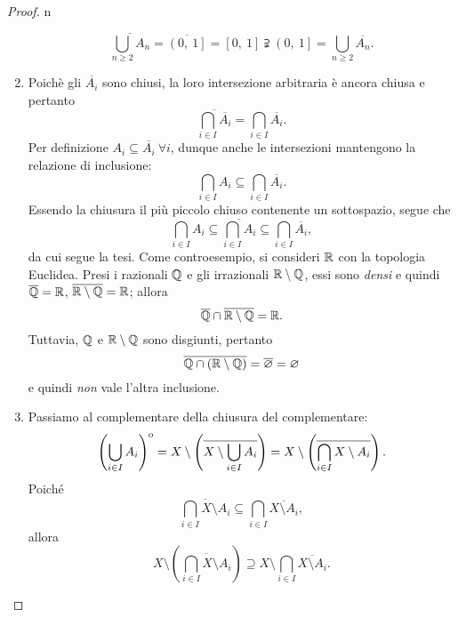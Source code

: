 \begin{proof}{n}
\begin{enumerate}[label=\Roman*]
\begin{equation*}
	\overline{\bigcup_{n\geq 2}A_n}=\overline{\left(0,\ 1\right]}=\left[0,\ 1\right]\supsetneqq\left(0,\ 1\right]=\bigcup_{n\geq 2}\overline{A_n}.
\end{equation*}
\item Poichè gli $\overline{A_i}$ sono chiusi, la loro intersezione arbitraria è ancora chiusa e pertanto
\begin{equation*}
	\overline{\bigcap_{i\in I}\overline{A_i}}=\bigcap_{i\in I}\overline{A_i}.
\end{equation*}
Per definizione $A_i\subseteq\overline{A_i}\ \forall i$, dunque anche le intersezioni mantengono la relazione di inclusione:
\begin{equation*}
	\bigcap_{i\in I}A_i\subseteq\bigcap_{i\in I}\overline{A_i}.
\end{equation*}
Essendo la chiusura il più piccolo chiuso contenente un sottospazio, segue che
\begin{equation*}
	\bigcap_{i\in I}A_i\subseteq\overline{\bigcap_{i\in I}A_i}\subseteq\bigcap_{i\in I}\overline{A_i},
\end{equation*}
da cui segue la tesi. Come controesempio, si consideri $\mathbb{R}$ con la topologia Euclidea. Presi i razionali $\mathbb{Q}$ e gli irrazionali $\mathbb{R}\setminus\mathbb{Q}$, essi sono \textit{densi} e quindi $\overline{\mathbb{Q}}=\mathbb{R}$, $\overline{\mathbb{R}\setminus\mathbb{Q}}=\mathbb{R}$; allora
\begin{equation*}
	\overline{\mathbb{Q}}\cap\overline{\mathbb{R}\setminus\mathbb{Q}}=\mathbb{R}.
\end{equation*}
Tuttavia, $\mathbb{Q}$ e $\mathbb{R}\setminus\mathbb{Q}$ sono disgiunti, pertanto
\begin{equation*}
	\overline{\mathbb{Q}\cap\left(\mathbb{R}\setminus\mathbb{Q}\right)}=\overline{\varnothing}=\varnothing
\end{equation*}
e quindi \textit{non} vale l'altra inclusione.
\item Passiamo al complementare della chiusura del complementare:
\begin{equation*}
{\kern0pt\left(\bigcup_{i\in I}A_i\right)}^{\mathrm{o}}=X\setminus\left(\overline{X\setminus \bigcup_{i\in I}A_i}\right)=X\setminus\left(\overline{\bigcap_{i\in I}X\setminus A_i}\right).
\end{equation*}
Poiché
\begin{equation*}
	\overline{\bigcap_{i\in I}X\setminus A_i}\subseteq \bigcap_{i\in I}\overline{X\setminus A_i},
\end{equation*}
allora
\begin{equation*}
	X\setminus\left(\overline{\bigcap_{i\in I}X\setminus A_i}\right) \supseteq X\setminus\bigcap_{i\in I}\overline{X\setminus A_i}.
\end{equation*}

\end{enumerate}
\end{proof}
